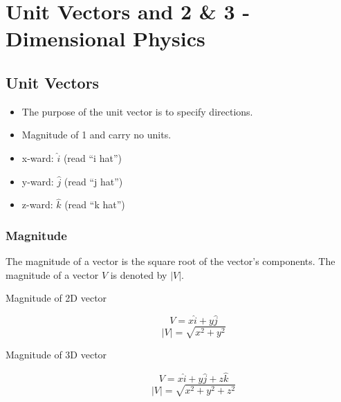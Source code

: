 \chapter{Unit Vectors and 2 \& 3 - Dimensional Physics}

\section{Unit Vectors}

\begin{itemize}
    \item The purpose of the unit vector is
    to specify directions.

    \item Magnitude of 1 and carry no units.

    \item x-ward: $\hat{i}$ (read ``i hat'')

    \item y-ward: $\hat{j}$ (read ``j hat'')

    \item z-ward: $\hat{k}$ (read ``k hat'')
\end{itemize}

\subsection{Magnitude}

The magnitude of a vector is the square root
of the vector's components. The magnitude of
a vector $V$ is denoted by $|V|$.

\begin{description}
    \item[Magnitude of 2D vector]
        $$V = x\hat{i} + y\hat{j}$$
        $$|V| = \sqrt{x^2 + y^2}$$

    \item[Magnitude of 3D vector]
        $$V = x\hat{i} + y\hat{j} + z\hat{k}$$
        $$|V| = \sqrt{x^2 + y^2 + z^2}$$
\end{description}
